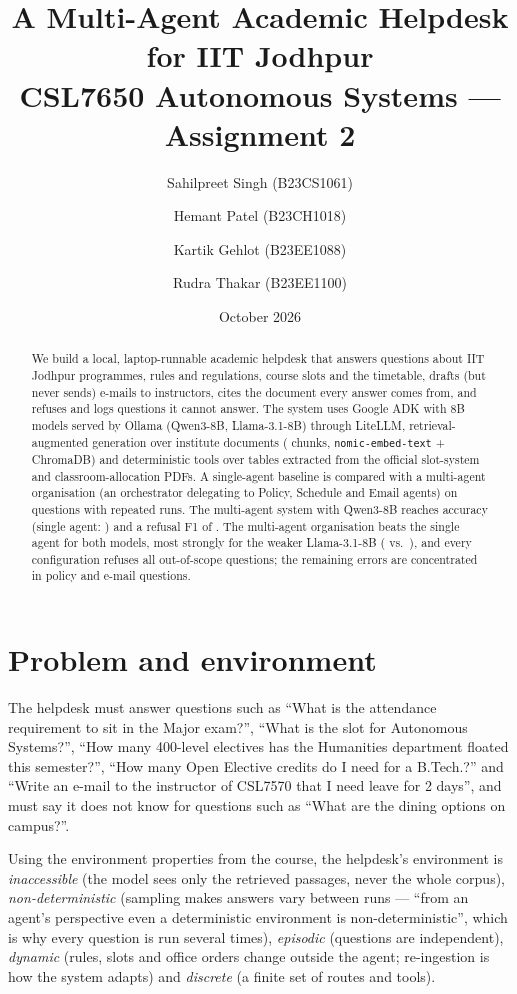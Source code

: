 \documentclass[11pt,a4paper]{article}
\title{\textbf{A Multi-Agent Academic Helpdesk for IIT Jodhpur}\\[2pt]
\large CSL7650 Autonomous Systems --- Assignment 2}
\author{Sahilpreet Singh (B23CS1061) \and Hemant Patel (B23CH1018) \and
        Kartik Gehlot (B23EE1088) \and Rudra Thakar (B23EE1100)}
\date{October 2026}
\begin{document}
\maketitle

\begin{abstract}
We build a local, laptop-runnable academic helpdesk that answers questions about IIT Jodhpur programmes,
rules and regulations, course slots and the timetable, drafts (but never sends) e-mails to instructors,
cites the document every answer comes from, and refuses and logs questions it cannot answer.
The system uses Google ADK with 8B models served by Ollama (Qwen3-8B, Llama-3.1-8B) through LiteLLM,
retrieval-augmented generation over \numCorpusDocs{} institute documents (\numCorpusChunks{} chunks,
\texttt{nomic-embed-text} + ChromaDB) and deterministic tools over tables extracted from the official
slot-system and classroom-allocation PDFs. A single-agent baseline is compared with a multi-agent
organisation (an orchestrator delegating to Policy, Schedule and Email agents) on \numEvalQuestions{}
questions with repeated runs. The multi-agent system with Qwen3-8B reaches \accMultiQwen{} accuracy
(single agent: \accSingleQwen{}) and a refusal F1 of .
The multi-agent organisation beats the single agent for both models, most strongly for the weaker
Llama-3.1-8B (\accMultiLlama{} vs.\ \accSingleLlama{}), and every configuration refuses all
out-of-scope questions; the remaining errors are concentrated in policy and e-mail questions.
\end{abstract}

\section{Problem and environment}
The helpdesk must answer questions such as ``What is the attendance requirement to sit in the Major
exam?'', ``What is the slot for Autonomous Systems?'', ``How many 400-level electives has the Humanities
department floated this semester?'', ``How many Open Elective credits do I need for a B.Tech.?'' and
``Write an e-mail to the instructor of CSL7570 that I need leave for 2 days'', and must say it does not
know for questions such as ``What are the dining options on campus?''.

Using the environment properties from the course, the helpdesk's environment is
\emph{inaccessible} (the model sees only the retrieved passages, never the whole corpus),
\emph{non-deterministic} (sampling makes answers vary between runs --- ``from an agent's perspective even a
deterministic environment is non-deterministic'', which is why every question is run several times),
\emph{episodic} (questions are independent), \emph{dynamic} (rules, slots and office orders change outside
the agent; re-ingestion is how the system adapts) and \emph{discrete} (a finite set of routes and tools).
\end{document}
